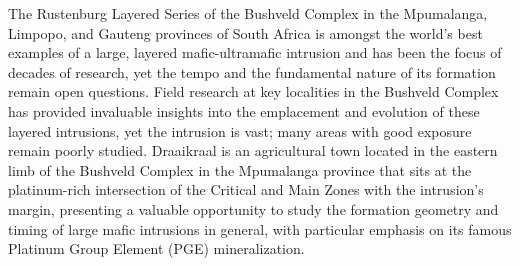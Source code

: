 
The Rustenburg Layered Series of the Bushveld Complex in the Mpumalanga, Limpopo, 
and Gauteng provinces of South Africa is amongst the 
world's best examples of a large, layered mafic-ultramafic intrusion 
and has been the focus of decades of research, yet the tempo and the fundamental 
nature of its formation remain open questions. Field research at key localities in 
the Bushveld Complex has provided invaluable insights into the emplacement and evolution of these layered intrusions,
yet the intrusion is vast; many areas with good exposure remain poorly studied. 
Draaikraal is an agricultural town located
in the eastern limb of the Bushveld Complex in the Mpumalanga province that sits at the platinum-rich intersection of the Critical 
and Main Zones with the intrusion's margin, presenting a valuable opportunity to study the formation geometry and timing of large mafic intrusions in general, with
particular emphasis on its famous Platinum Group Element (PGE) mineralization. 

